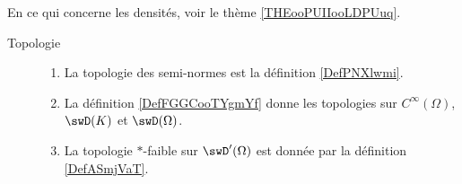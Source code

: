 
En ce qui concerne les densités, voir le thème \ref{THEooPUIIooLDPUuq}.


\begin{description}
    \item[Topologie]

        \begin{enumerate}
            \item
                La topologie des semi-normes est la définition \ref{DefPNXlwmi}.
            \item
                La définition \ref{DefFGGCooTYgmYf} donne les topologies sur \(  C^{\infty}(\Omega)\), \( \swD(K)\) et \( \swD(\Omega)\).
            \item
                La topologie \( *\)-faible sur \( \swD'(\Omega)\) est donnée par la définition \ref{DefASmjVaT}.
        \end{enumerate}
\end{description}
